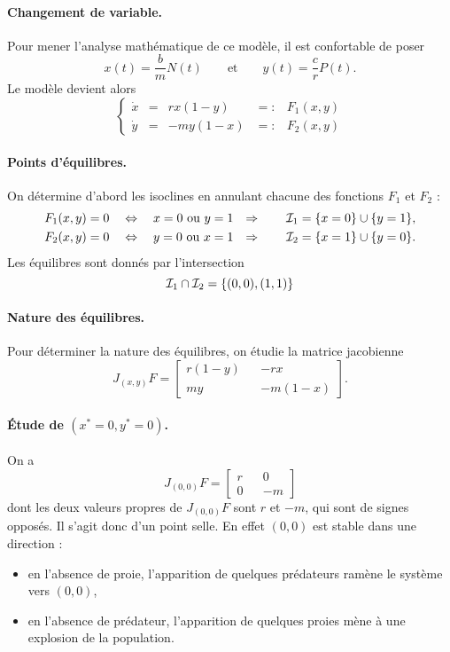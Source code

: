 \paragraph*{Changement de variable.}
Pour mener l'analyse mathématique de ce modèle, il est confortable de poser
$$
x(t) = \frac{b}m N(t)
\qquad \text{et} \qquad
y(t) = \frac{c}r P(t).
$$
Le modèle devient alors
$$
\left\{\begin{array}{rcrcl} 
  \dot x & = & r x (1-y) & =: & F_1(x, y) \\
  \dot y & = & -m y (1-x) & =: & F_2(x, y)
\end{array}\right.
$$

\paragraph*{Points d'équilibres.}
On détermine d'abord les isoclines en annulant chacune des fonctions $F_1$ et $F_2$ :
\begin{align*}
  F_1(x, y) & = 0 \quad \Leftrightarrow \quad x = 0 \text{ ou } y = 1 &
  \Rightarrow \qquad \mathcal{I}_1 & = \{x = 0\} \cup \{y = 1\}, \\
  F_2(x, y) & = 0 \quad \Leftrightarrow \quad y = 0 \text{ ou } x = 1 &
  \Rightarrow \qquad \mathcal{I}_2 & = \{x = 1\} \cup \{y = 0\}.
\end{align*}
Les équilibres sont donnés par l'intersection 
$$
\mathcal{I}_1 \cap \mathcal{I}_2 = \{(0, 0), (1, 1)\}
$$

\paragraph*{Nature des équilibres.}
Pour déterminer la nature des équilibres, on étudie la matrice jacobienne
$$
J_{(x, y)}F = 
  \left[\begin{array}{ccc} 
    r (1-y) & & -r x \\
    m y & & -m (1-x)
  \end{array}\right].
$$

\paragraph*{\'Etude de $(x^* = 0, y^* = 0)$.}
On a 
$$
J_{(0, 0)}F = 
  \left[\begin{array}{ccc} 
    r  & & 0 \\
    0 & & -m 
  \end{array}\right]
$$
dont les deux valeurs propres de $J_{(0, 0)}F$ sont $r$ et $-m$, qui sont de signes opposés. Il s'agit donc d'un point selle. En effet $(0, 0)$ est stable dans une direction : 
\begin{itemize}
  \item en l'absence de proie, l'apparition de quelques prédateurs ramène le système vers $(0, 0)$, 
  \item en l'absence de prédateur, l'apparition de quelques proies mène à une explosion de la population.
\end{itemize}
  
